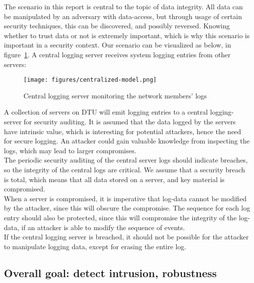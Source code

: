The scenario in this report is central to the topic of data integrity. All data can be manipulated by an adversary with data-access, but through usage of certain security techniques, this can be discovered, and possibly reversed. Knowing whether to trust data or not is extremely important, which is why this scenario is important in a security context.
Our scenario can be visualized as below, in figure~\ref{fig:model}. A central logging server receives system logging entries from other servers:

\begin{figure}[H]
  \centering
  \texttt{[image: figures/centralized-model.png]}
  \caption{\label{fig:model} Central logging server monitoring the
    network members' logs}
\end{figure}

A collection of servers on DTU will emit logging entries to a central logging-server for security auditing. It is assumed that the data logged by the servers have intrinsic value, which is interesting for potential attackers, hence the need for secure logging. An attacker could gain valuable knowledge from inspecting the logs, which may lead to larger compromises.
\\The periodic security auditing of the central server logs should indicate breaches, so the integrity of the central logs are critical.
We assume that a security breach is total, which means that all data stored on a server, and key material is compromised.
\\When a server is compromised, it is imperative that log-data cannot be modified by the attacker, since this will obscure the compromise.
The sequence for each log entry should also be protected, since this will compromise the integrity of the log-data, if an attacker is able to modify the sequence of events.
\\If the central logging server is breached, it should not be possible for the attacker to manipulate logging data, except for erasing the entire log.

\subsection{Overall goal: detect intrusion, robustness}


